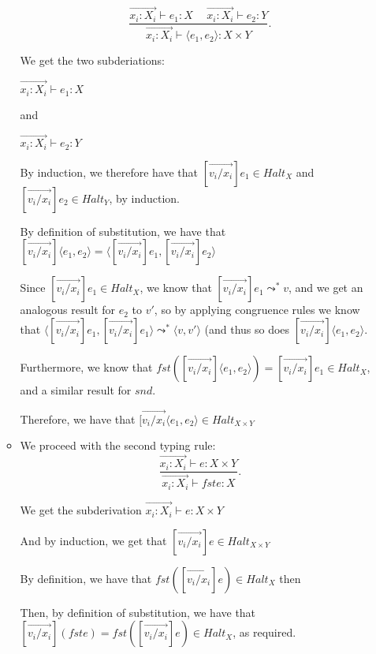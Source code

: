 \begin{enumerate}
\begin{itemize}
        \[
          \frac{\overrightarrow{x_i : X_i} \vdash e_1 : X \hspace{15pt} \overrightarrow{x_i : X_i} \vdash e_2 : Y}{\overrightarrow{x_i : X_i} \vdash \langle e_1, e_2 \rangle : X \times Y}
        .\] 

        We get the two subderiations:

        $\overrightarrow{x_i : X_i} \vdash e_1 : X$

        and

        $\overrightarrow{x_i : X_i} \vdash e_2 : Y$

        By induction, we therefore have that $[\overrightarrow{v_i / x_i}]e_1 \in Halt_X$ and $[\overrightarrow{v_i / x_i}]e_2 \in Halt_Y$, by induction.

        By definition of substitution, we have that $[\overrightarrow{v_i / x_i}]\langle e_1, e_2 \rangle = \langle [\overrightarrow{v_i / x_i}]e_1, [\overrightarrow{v_i / x_i}]e_2 \rangle$

        Since $[\overrightarrow{v_i / x_i}]e_1 \in Halt_X$, we know that $[\overrightarrow{v_i / x_i}]e_1 \leadsto^* v$, and we get an analogous result for $e_2$ to $v'$, so by applying congruence rules we know that $\langle[\overrightarrow{v_i / x_i}]e_1, [\overrightarrow{v_i / x_i}]e_1 \rangle \leadsto^* \langle v, v'\rangle$ (and thus so does $[\overrightarrow{v_i / x_i}]\langle e_1, e_2 \rangle$.

        Furthermore, we know that $fst ([\overrightarrow{v_i / x_i}]\langle e_1, e_2 \rangle) = [\overrightarrow{v_i / x_i}]e_1 \in Halt_X$, and a similar result for $snd$. 

        Therefore, we have that $[\overrightarrow{v_i / x_i} \langle e_1, e_2 \rangle \in Halt_{X \times Y}$

      \item

        We proceed with the second typing rule:
        \[
          \frac{\overrightarrow{x_i : X_i} \vdash e : X \times Y}{\overrightarrow{x_i : X_i} \vdash fst e : X}
        .\] 

        We get the subderivation $\overrightarrow{x_i : X_i} \vdash e : X \times Y$

        And by induction, we get that $[\overrightarrow{v_i / x_i}]e \in Halt_{X \times Y}$

        By definition, we have that $fst ([\overrightarrow{v_i / x_i}]e) \in Halt_X$ then

        Then, by definition of substitution, we have that $[\overrightarrow{v_i / x_i}](fst e) = fst ([\overrightarrow{v_i / x_i}] e) \in Halt_X$, as required.


\end{itemize}
\end{enumerate}
